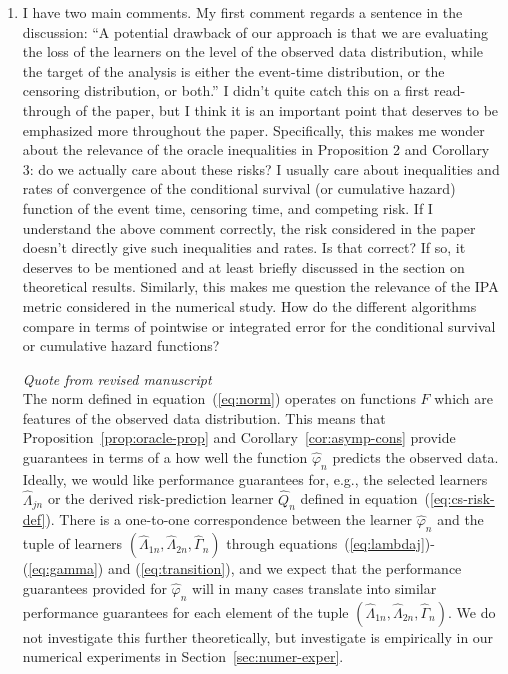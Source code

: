 \documentclass[a4paper,danish]{article}
\renewcommand{\phi}{\varphi}
\newcommand{\1}{\mathds{1}}
\newcommand{\qrev}[1]{
\vspace{.5em}
\begin{tcolorbox}[boxrule=0pt]
\hfill{\it\footnotesize Quote from revised manuscript}\\[.5em]
#1
\end{tcolorbox}
}
\newcommand{\answer}[1]{{\vspace{1em}{\bf #1}\vspace{1em}}}
\begin{document}
\begin{enumerate}
\item I have two main comments. My first comment regards a sentence in
the discussion: ``A potential drawback of our approach is that we
are evaluating the loss of the learners on the level of the
observed data distribution, while the target of the analysis is
either the event-time distribution, or the censoring distribution,
or both.” I didn’t quite catch this on a first read-through of the
paper, but I think it is an important point that deserves to be
emphasized more throughout the paper. Specifically, this makes me
wonder about the relevance of the oracle inequalities in
Proposition 2 and Corollary 3: do we actually care about these
risks? I usually care about inequalities and rates of convergence
of the conditional survival (or cumulative hazard) function of the
event time, censoring time, and competing risk. If I understand the
above comment correctly, the risk considered in the paper doesn’t
directly give such inequalities and rates. Is that correct? If so,
it deserves to be mentioned and at least briefly discussed in the
section on theoretical results. Similarly, this makes me question
the relevance of the IPA metric considered in the numerical
study. How do the different algorithms compare in terms of
pointwise or integrated error for the conditional survival or
cumulative hazard functions?

 \answer{This is an important point, which we agree should be made
   clear in the paper. We have added the following paragraph discussing
   this point at the end of Section 5.}

   \qrev{The norm defined in equation~(\ref{eq:norm}) operates on functions
   \( F \) which are features of the observed data distribution. This
   means that Proposition~\ref{prop:oracle-prop} and
   Corollary~\ref{cor:asymp-cons} provide guarantees in terms of a how
   well the function $\hat{\phi}_n$ predicts the observed data. Ideally,
   we would like performance guarantees for, e.g., the selected learners
   $\hat{\Lambda}_{jn}$ or the derived risk-prediction learner
   $\hat{Q}_{n}$ defined in equation~(\ref{eq:cs-risk-def}). There is a
   one-to-one correspondence between the learner $\hat{\phi}_n$ and the
   tuple of learners
   \((\hat \Lambda_{1n},\hat \Lambda_{2n}, \hat \Gamma_{n})\) through
   equations~(\ref{eq:lambdaj})-(\ref{eq:gamma}) and
   (\ref{eq:transition}), and we expect that the performance guarantees
   provided for $\hat{\phi}_n$ will in many cases translate into similar
   performance guarantees for each element of the tuple
   \((\hat \Lambda_{1n},\hat \Lambda_{2n}, \hat \Gamma_{n})\). We do not
   investigate this further theoretically, but investigate is empirically
   in our numerical experiments in Section~\ref{sec:numer-exper}.}


\end{enumerate}
\end{document}
